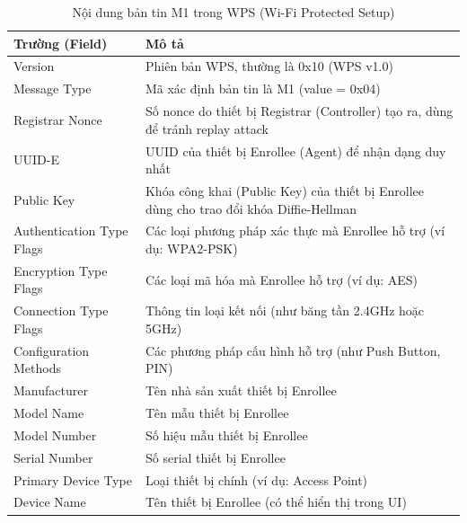 \begin{table}[ht]
\centering
\caption{Nội dung bản tin M1 trong WPS (Wi-Fi Protected Setup)}
\begin{tabular}{|>{\raggedright\arraybackslash}m{4cm}|>{\raggedright\arraybackslash}m{9cm}|}
\hline
\textbf{Trường (Field)} & \textbf{Mô tả} \\
\hline
Version & Phiên bản WPS, thường là 0x10 (WPS v1.0) \\
\hline
Message Type & Mã xác định bản tin là M1 (value = 0x04) \\
\hline
Registrar Nonce & Số nonce do thiết bị Registrar (Controller) tạo ra, dùng để tránh replay attack \\
\hline
UUID-E & UUID của thiết bị Enrollee (Agent) để nhận dạng duy nhất \\
\hline
Public Key & Khóa công khai (Public Key) của thiết bị Enrollee dùng cho trao đổi khóa Diffie-Hellman \\
\hline
Authentication Type Flags & Các loại phương pháp xác thực mà Enrollee hỗ trợ (ví dụ: WPA2-PSK) \\
\hline
Encryption Type Flags & Các loại mã hóa mà Enrollee hỗ trợ (ví dụ: AES) \\
\hline
Connection Type Flags & Thông tin loại kết nối (như băng tần 2.4GHz hoặc 5GHz) \\
\hline
Configuration Methods & Các phương pháp cấu hình hỗ trợ (như Push Button, PIN) \\
\hline
Manufacturer & Tên nhà sản xuất thiết bị Enrollee \\
\hline
Model Name & Tên mẫu thiết bị Enrollee \\
\hline
Model Number & Số hiệu mẫu thiết bị Enrollee \\
\hline
Serial Number & Số serial thiết bị Enrollee \\
\hline
Primary Device Type & Loại thiết bị chính (ví dụ: Access Point) \\
\hline
Device Name & Tên thiết bị Enrollee (có thể hiển thị trong UI) \\
\hline
\end{tabular}
\end{table}

